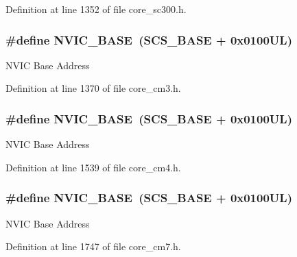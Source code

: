 Definition at line 1352 of file core\+\_\+sc300.\+h.

\subsubsection[{\texorpdfstring{N\+V\+I\+C\+\_\+\+B\+A\+SE}{NVIC_BASE}}]{\setlength{\rightskip}{0pt plus 5cm}\#define N\+V\+I\+C\+\_\+\+B\+A\+SE~({\bf S\+C\+S\+\_\+\+B\+A\+SE} +  0x0100\+U\+L)}\hypertarget{group___c_m_s_i_s__core__base_gaa0288691785a5f868238e0468b39523d}{}\label{group___c_m_s_i_s__core__base_gaa0288691785a5f868238e0468b39523d}
N\+V\+IC Base Address 

Definition at line 1370 of file core\+\_\+cm3.\+h.

\subsubsection[{\texorpdfstring{N\+V\+I\+C\+\_\+\+B\+A\+SE}{NVIC_BASE}}]{\setlength{\rightskip}{0pt plus 5cm}\#define N\+V\+I\+C\+\_\+\+B\+A\+SE~({\bf S\+C\+S\+\_\+\+B\+A\+SE} +  0x0100\+U\+L)}\hypertarget{group___c_m_s_i_s__core__base_gaa0288691785a5f868238e0468b39523d}{}\label{group___c_m_s_i_s__core__base_gaa0288691785a5f868238e0468b39523d}
N\+V\+IC Base Address 

Definition at line 1539 of file core\+\_\+cm4.\+h.

\subsubsection[{\texorpdfstring{N\+V\+I\+C\+\_\+\+B\+A\+SE}{NVIC_BASE}}]{\setlength{\rightskip}{0pt plus 5cm}\#define N\+V\+I\+C\+\_\+\+B\+A\+SE~({\bf S\+C\+S\+\_\+\+B\+A\+SE} +  0x0100\+U\+L)}\hypertarget{group___c_m_s_i_s__core__base_gaa0288691785a5f868238e0468b39523d}{}\label{group___c_m_s_i_s__core__base_gaa0288691785a5f868238e0468b39523d}
N\+V\+IC Base Address 

Definition at line 1747 of file core\+\_\+cm7.\+h.

